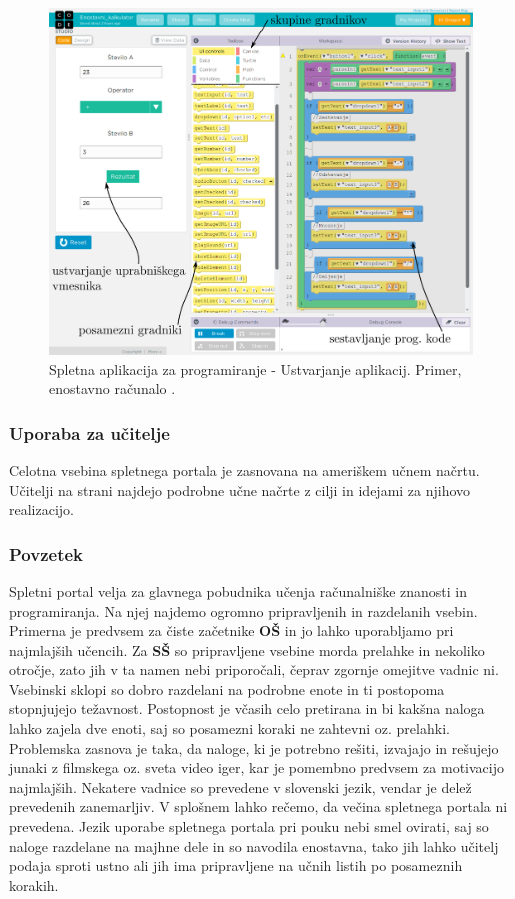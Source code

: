 \begin{figure}[h!]
  \centering
    \includegraphics [width=0.90\linewidth, keepaspectratio =
    1] {./images/sc_web/code_cs_mobile.png}
    \caption{Spletna aplikacija za programiranje - Ustvarjanje
      aplikacij. Primer, enostavno računalo \cite{web:code.org:studio}.}
    \label{fig:scr:web:code:mp:app}
  \end{figure}

\subsubsection{Uporaba za učitelje}
\label{sec:uporaba-za-uitelje}

Celotna vsebina spletnega portala je zasnovana na ameriškem učnem
načrtu. Učitelji na strani najdejo podrobne učne načrte z cilji in
idejami za njihovo realizacijo. 

\subsubsection{Povzetek}
\label{sec:povzetek-code}

Spletni portal velja za glavnega pobudnika učenja računalniške
znanosti in programiranja. Na njej najdemo ogromno pripravljenih in
razdelanih vsebin. Primerna je predvsem za čiste začetnike \textbf{OŠ}
in jo lahko uporabljamo pri najmlajših učencih. Za \textbf{SŠ} so
pripravljene vsebine morda prelahke in nekoliko otročje, zato jih v ta
namen nebi priporočali, čeprav zgornje omejitve vadnic ni. Vsebinski
sklopi so dobro razdelani na podrobne enote in ti postopoma
stopnjujejo težavnost. Postopnost je včasih celo pretirana in bi
kakšna naloga lahko zajela dve enoti, saj so posamezni koraki ne
zahtevni oz. prelahki. Problemska zasnova je taka, da naloge, ki je
potrebno rešiti, izvajajo in rešujejo junaki z filmskega oz. sveta
video iger, kar je pomembno predvsem za motivacijo
najmlajših. Nekatere vadnice so prevedene v slovenski jezik, vendar je
delež prevedenih zanemarljiv. V splošnem lahko rečemo, da večina
spletnega portala ni prevedena. Jezik uporabe spletnega portala pri
pouku nebi smel ovirati, saj so naloge razdelane na majhne dele in so
navodila enostavna, tako jih lahko učitelj podaja sproti ustno ali jih
ima pripravljene na učnih listih po posameznih korakih.

